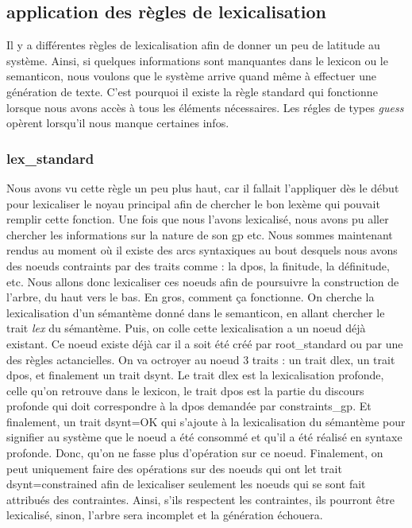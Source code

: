 \subsection{application des règles de lexicalisation}

Il y a différentes règles de lexicalisation afin de donner un peu de latitude au système. Ainsi, si quelques informations sont manquantes dans le lexicon ou le semanticon, nous voulons que le système arrive quand même à effectuer une génération de texte. C'est pourquoi il existe la règle standard qui fonctionne lorsque nous avons accès à tous les éléments nécessaires. Les régles de types \emph{guess} opèrent lorsqu'il nous manque certaines infos. 

\subsubsection{lex{\_}standard}

Nous avons vu cette règle un peu plus haut, car il fallait l'appliquer dès le début pour lexicaliser le noyau principal afin de chercher le bon lexème qui pouvait remplir cette fonction. Une fois que nous l'avons lexicalisé, nous avons pu aller chercher les informations sur la nature de son gp etc. Nous sommes maintenant rendus au moment où il existe des arcs syntaxiques au bout desquels nous avons des noeuds contraints par des traits comme : la dpos, la finitude, la définitude, etc. Nous allons donc lexicaliser ces noeuds afin de poursuivre la construction de l'arbre, du haut vers le bas. En gros, comment ça fonctionne. On cherche la lexicalisation d'un sémantème donné dans le semanticon, en allant chercher le trait \emph{lex} du sémantème. Puis, on colle cette lexicalisation a un noeud déjà existant. Ce noeud existe déjà car il a soit été créé par root{\_}standard ou par une des règles actancielles. On va octroyer au noeud 3 traits : un trait dlex, un trait dpos, et finalement un trait dsynt. Le trait dlex est la lexicalisation profonde, celle qu'on retrouve dans le lexicon, le trait dpos est la partie du discours profonde qui doit correspondre à la dpos demandée par constraints{\_}gp. Et finalement, un trait dsynt=OK qui s'ajoute à la lexicalisation du sémantème pour signifier au système que le noeud a été consommé et qu'il a été réalisé en syntaxe profonde. Donc, qu'on ne fasse plus d'opération sur ce noeud. Finalement, on peut uniquement faire des opérations sur des noeuds qui ont let trait dsynt=constrained afin de lexicaliser seulement les noeuds qui se sont fait attribués des contraintes. Ainsi, s'ils respectent les contraintes, ils pourront être lexicalisé, sinon, l'arbre sera incomplet et la génération échouera.

